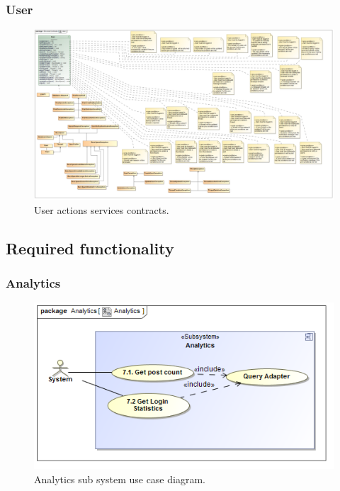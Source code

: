 \documentclass [a4paper,12pt] {article}
\begin{document}
		\subsubsection{User}
			\begin{figure}[H]
				\centering
				\includegraphics[width=1.0\textwidth]{UserSC.png}
				\caption{User actions services contracts.}
			\end{figure}
\pagebreak
	\subsection{Required functionality}
		\subsubsection{Analytics}
			\begin{figure}[H]
				\centering
				\includegraphics[width=1.0\textwidth]{AnalyticsUC.png}
				\caption{Analytics sub system use case diagram.}
			\end{figure}
\end{document}
